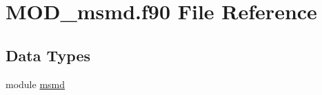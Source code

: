 \hypertarget{MOD__msmd_8f90}{\section{M\-O\-D\-\_\-msmd.\-f90 File Reference}
\label{MOD__msmd_8f90}
}
\subsection*{Data Types}
\begin{DoxyCompactItemize}
\item 
module \hyperlink{classmsmd}{msmd}
\end{DoxyCompactItemize}
